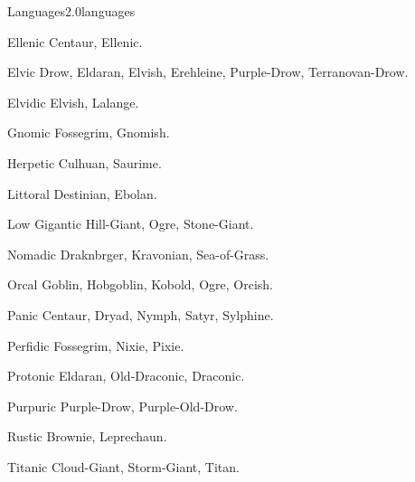 \begin{skill}{Languages}{2.0}{languages}
\begin{Description}
\item[Ellenic] Centaur, Ellenic.

\item[Elvic] Drow, Eldaran, Elvish, Erehleine, Purple-Drow, Terranovan-Drow.

\item[Elvidic] Elvish, Lalange.

\item[Gnomic] Fossegrim, Gnomish.

\item[Herpetic] Culhuan, Saurime.

\item[Littoral] Destinian, Ebolan.

\item[Low Gigantic] Hill-Giant, Ogre, Stone-Giant.

\item[Nomadic] Draknbrger, Kravonian, Sea-of-Grass.

\item[Orcal] Goblin, Hobgoblin, Kobold, Ogre, Orcish.

\item[Panic] Centaur, Dryad, Nymph, Satyr, Sylphine.

\item[Perfidic] Fossegrim, Nixie, Pixie.

\item[Protonic] Eldaran, Old-Draconic, Draconic.

\item[Purpuric] Purple-Drow, Purple-Old-Drow.

\item[Rustic] Brownie, Leprechaun.

\item[Titanic] Cloud-Giant, Storm-Giant, Titan.

\end{Description}
\end{skill}
